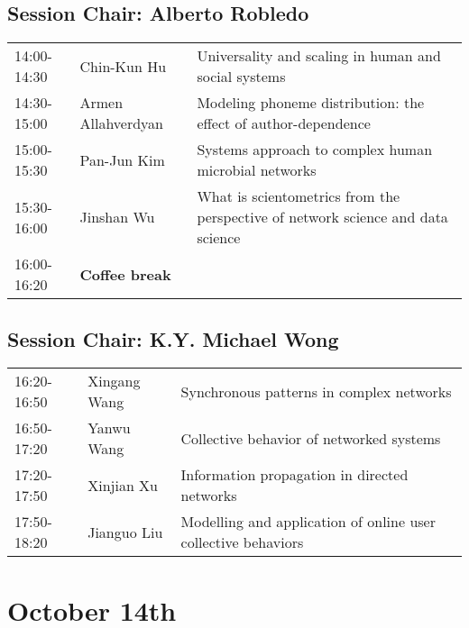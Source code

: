 \documentclass[oneside,A4paper,12pt]{article}
\begin{document}
\subsection*{Session \uppercase\expandafter{}  \hspace{10mm} Chair: Alberto Robledo}
\label{sec:org1ffa554}

\begin{center}
\begin{tabular}{p{2.5cm}p{4cm}p{8.5cm}}
\toprule
14:00-14:30 & Chin-Kun Hu & Universality and scaling in human and social systems\\
14:30-15:00 & Armen Allahverdyan & Modeling phoneme distribution: the effect of author-dependence\\
15:00-15:30 & Pan-Jun Kim & Systems approach to complex human microbial networks\\
15:30-16:00 & Jinshan Wu & What is scientometrics from the perspective of network science and data science\\
\cellcolor{blue!25}16:00-16:20 & \cellcolor{blue!25}\textbf{Coffee break} & \cellcolor{blue!25}\\
\bottomrule
\end{tabular}
\end{center}

\subsection*{Session \uppercase\expandafter{}  \hspace{5mm} Chair: K.Y. Michael Wong}
\label{sec:orgedf94f1}

\begin{center}
\begin{tabular}{p{2.5cm}p{4cm}p{8.5cm}}
\toprule
16:20-16:50 & Xingang Wang & Synchronous patterns in complex networks\\
16:50-17:20 & Yanwu Wang & Collective behavior of networked systems\\
17:20-17:50 & Xinjian Xu & Information propagation in directed networks\\
17:50-18:20 & Jianguo Liu & Modelling and application of online user collective behaviors\\
\bottomrule
\end{tabular}
\end{center}




\section*{October 14th}
\label{sec:orgbc06a13}
\end{document}
